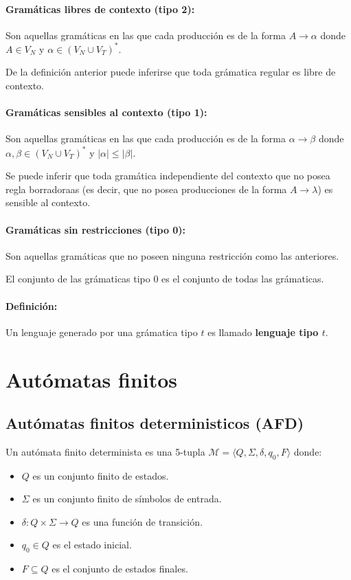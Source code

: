\paragraph{Gramáticas libres de contexto (tipo 2):} Son aquellas gramáticas en las que cada producción es de la forma \(A\to\alpha\) donde \(A\in V_N\) y \(\alpha\in(V_N\cup V_T)^*\).

De la definición anterior puede inferirse que toda grámatica regular es libre de contexto.

\paragraph{Gramáticas sensibles al contexto (tipo 1):} Son aquellas gramáticas en las que cada producción es de la forma \(\alpha\to\beta\) donde \(\alpha,\beta\in(V_N\cup V_T)^*\) y \(|\alpha|\leq |\beta|\).

Se puede inferir que toda gramática independiente del contexto que no posea regla borradoraas (es decir, que no posea producciones de la forma \(A\to\lambda\)) es sensible al contexto.

\paragraph{Gramáticas sin restricciones (tipo 0):} Son aquellas gramáticas que no poseen ninguna restricción como las anteriores.

El conjunto de las grámaticas tipo 0 es el conjunto de todas las grámaticas.

\paragraph{Definición:} Un lenguaje generado por una grámatica tipo \(t\) es llamado \textbf{lenguaje tipo \(t\)}.

\newpage
\section{Autómatas finitos}
\subsection{Autómatas finitos deterministicos (AFD)}
Un autómata finito determinista es una 5-tupla \(\mathcal{M}=\langle Q,\Sigma,\delta,q_0,F\rangle\) donde:
\begin{itemize}
  \item \(Q\) es un conjunto finito de estados.
  \item \(\Sigma\) es un conjunto finito de símbolos de entrada.
  \item \(\delta:Q\times\Sigma\to Q\) es una función de transición.
  \item \(q_0\in Q\) es el estado inicial.
  \item \(F\subseteq Q\) es el conjunto de estados finales.
\end{itemize}

